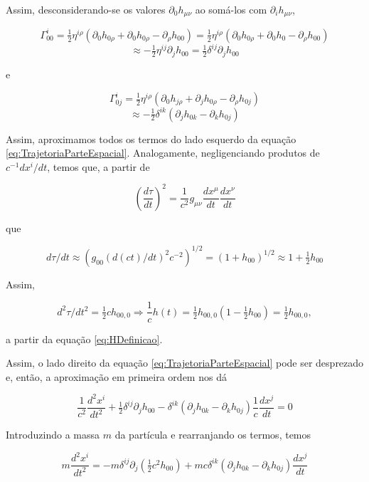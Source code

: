 Assim, desconsiderando-se os valores $ \partial_{0} h_{\mu \nu} $ ao somá-los com $ \partial_{i} h_{\mu \nu} $,

\[
\Gamma_{00}^{i}=\tfrac{1}{2} \eta^{i \rho}\left(\partial_{0} h_{0 \rho}+\partial_{0} h_{0 \rho}-\partial_{\rho} h_{00}\right) = 
\tfrac{1}{2} \eta^{i \rho}\left(\partial_{0} h_{0 \rho}+\partial_{0} h_{0 }-\partial_{\rho} h_{00}\right)
\]
\[
\approx -\tfrac{1}{2} \eta^{i j} \partial_{j} h_{00}=\tfrac{1}{2} \delta^{i j} \partial_{j} h_{00}
\]

e

\[
\Gamma_{0 j}^{i}=\tfrac{1}{2} \eta^{i \rho}\left(\partial_{0} h_{j \rho}+\partial_{j} h_{0 \rho}-\partial_{\rho} h_{0 j}\right)
\]
\[
\approx -\tfrac{1}{2} \delta^{i k}\left(\partial_{j} h_{0 k}-\partial_{k} h_{0 j}\right)
\]

Assim, aproximamos todos os termos do lado esquerdo da equação \eqref{eq:TrajetoriaParteEspacial}. Analogamente, negligenciando produtos de $ c^{-1} d x^{i} / d t $, temos que, a partir de

\[
\left(\frac{d \tau}{d t}\right)^{2}=\frac{1}{c^{2}} g_{\mu \nu} \frac{d x^{\mu}}{d t} \frac{d x^{\nu}}{d t}
\]

que

\[
d \tau / d t\approx \left(g_{00}\left({d(ct)}/dt\right)^2c^{-2}\right)^{1/2} = \left(1+h_{00}\right)^{1 / 2}\approx 1+\tfrac{1}{2} h_{00}
\]

Assim,

\[
d^{2} \tau / d t^{2}=\tfrac{1}{2} c h_{00,0} \Rightarrow \frac{1}{c} h(t)=\tfrac{1}{2} h_{00,0}\left(1-\tfrac{1}{2} h_{00}\right)=\tfrac{1}{2} h_{00,0},
\]

a partir da equação \eqref{eq:HDefinicao}. 

Assim, o lado direito da equação \eqref{eq:TrajetoriaParteEspacial} pode ser desprezado e, então, a aproximação em primeira ordem nos dá

\[
\frac{1}{c^{2}} \frac{d^{2} x^{i}}{d t^{2}}+\tfrac{1}{2} \delta^{i j} \partial_{j} h_{00}-\delta^{i k}\left(\partial_{j} h_{0 k}-\partial_{k} h_{0 j}\right) \frac{1}{c} \frac{d x^{j}}{d t}=0
\]

Introduzindo a massa $ m $ da partícula e rearranjando os termos, temos

\begin{equation}\label{eq:TrajetoriaParticulaComMassa}
m \frac{d^{2} x^{i}}{d t^{2}}=-m \delta^{i j} \partial_{j}\left(\tfrac{1}{2} c^{2} h_{00}\right)+m c \delta^{i k}\left(\partial_{j} h_{0 k}-\partial_{k} h_{0 j}\right) \frac{d x^{j}}{d t}
\end{equation}


